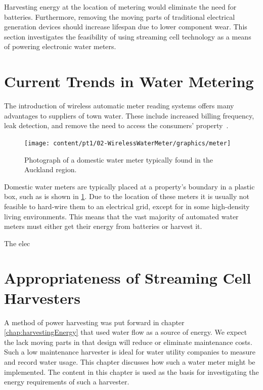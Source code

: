   Harvesting energy at the location of metering would eliminate the need for batteries.
  Furthermore, removing the moving parts of traditional electrical generation devices should increase lifespan due to lower component wear.
  This section investigates the feasibility of using streaming cell technology as a means of powering electronic water meters.

  \section{Current Trends in Water Metering}
    The introduction of wireless automatic meter reading systems offers many advantages to suppliers of town water.
    These include increased billing frequency, leak detection, and remove the need to access the consumers' property~\cite{Chang2012,Britton2013}.

    \begin{figure}
      \centering
      \texttt{[image: content/pt1/02-WirelessWaterMeter/graphics/meter]}
      \caption{\label{fig:Photo_DomesticWaterMeter}Photograph of a domestic water meter typically found in the Auckland region.}
    \end{figure}

    Domestic water meters are typically placed at a property's boundary in a plastic box, such as is shown in \cref{fig:Photo_DomesticWaterMeter}.
    Due to the location of these meters it is usually not feasible to hard-wire them to an electrical grid, except for in some high-density living environments.
    This means that the vast majority of automated water meters must either get their energy from batteries or harvest it.

    The elec

  \section{Appropriateness of Streaming Cell Harvesters}

  A method of power harvesting was put forward in chapter \ref{chap:harvestingEnergy} that used water flow as a source of energy.
  We expect the lack moving parts in that design will reduce or eliminate maintenance costs.
  Such a low maintenance harvester is ideal for water utility companies to measure and record water usage.
  This chapter discusses how such a water meter might be implemented.
  The content in this chapter is used as the basis for investigating the energy requirements of such a harvester.
  

